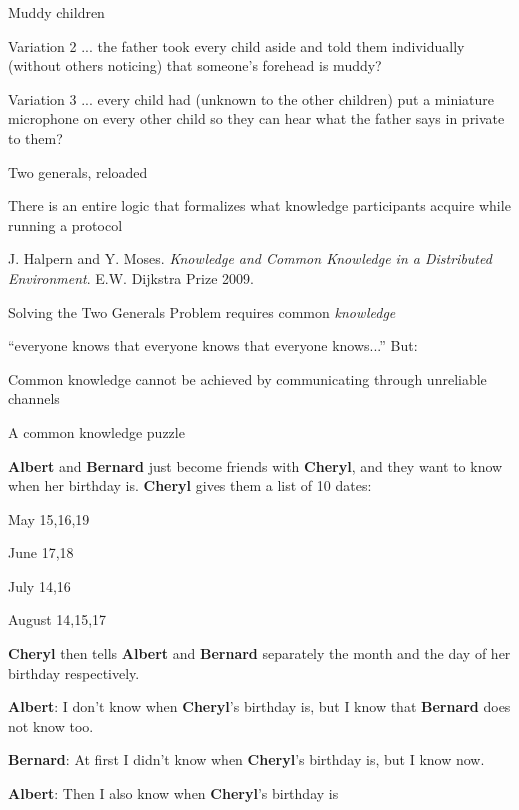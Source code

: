 \begin{frame}{Muddy children}
\begin{block}{Variation 2}
... the father took every child aside and told them individually (without others noticing) that someone’s forehead is muddy?
\end{block}
\begin{block}{Variation 3}
... every child had (unknown to the other children) put a miniature microphone on every other child so they can hear what the father says in private to them?
\end{block}
\end{frame}

\begin{frame}{Two generals, reloaded}
\BI
\item There is an entire logic that formalizes what knowledge participants acquire while running a protocol
\item J. Halpern and Y. Moses. \emph{Knowledge and Common Knowledge in a Distributed Environment}. E.W. Dijkstra Prize 2009.
\item Solving the Two Generals Problem requires common \emph{knowledge}
\BI
\item  “everyone knows that everyone knows that everyone knows...” 
\EI
\EI
\bigskip
But:
\BI
\item Common knowledge cannot be achieved by communicating through unreliable channels
\EI


\end{frame}

\begin{frame}{A common knowledge puzzle}

\textbf{Albert} and \textbf{Bernard} just become friends with \textbf{Cheryl}, and they want to know when her birthday is. \textbf{Cheryl} gives them a list of 10 dates:

\BI
\item May 15,16,19
\item June 17,18
\item July 14,16
\item August 14,15,17
\EI

\textbf{Cheryl} then tells \textbf{Albert} and \textbf{Bernard} separately the month and the day of her birthday respectively.

\BI
\item \textbf{Albert}: I don't know when \textbf{Cheryl}'s birthday is, but I know that \textbf{Bernard} does not know too.
\item \textbf{Bernard}: At first I didn't know when \textbf{Cheryl}'s birthday is, but I know now.
\item \textbf{Albert}: Then I also know when \textbf{Cheryl}'s birthday is
\EI
	
\end{frame}



